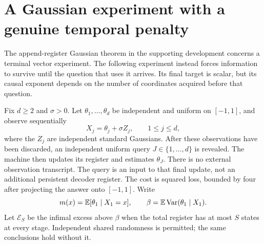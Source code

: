 \section{A Gaussian experiment with a genuine temporal penalty}
\label{sec:v9-delayed}
The append-register Gaussian theorem in the supporting development
concerns a terminal vector experiment. The following experiment instead
forces information to survive until the question that uses it arrives.
Its final target is scalar, but its causal exponent depends on the
number of coordinates acquired before that question.

Fix $d\ge2$ and $\sigma>0$. Let $\theta_1,\ldots,\theta_d$ be independent
and uniform on $[-1,1]$, and observe sequentially
\[
                  X_j=\theta_j+\sigma Z_j,\qquad 1\le j\le d,
\]
where the $Z_j$ are independent standard Gaussians. After these
observations have been discarded, an independent uniform query
$J\in\{1,\ldots,d\}$ is revealed. The machine then updates its register
and estimates $\theta_J$. There is no external observation transcript.
The query is an input to that final update, not an additional persistent
decoder register. The cost is squared loss, bounded by four after
projecting the answer onto $[-1,1]$. Write
\[
 m(x)=\mathbb E[\theta_1\mid X_1=x],\qquad
 \beta=\mathbb E\operatorname{Var}(\theta_1\mid X_1).
\]
Let $\mathcal E_S$ be the infimal excess above $\beta$ when the total
register has at most $S$ states at every stage. Independent shared
randomness is permitted; the same conclusions hold without it.

